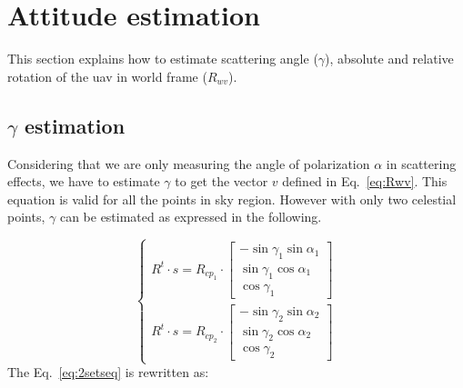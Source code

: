 \graphicspath{{./content/intro/figures/}}

\section{Attitude estimation}
\label{sec:g-abs-rel}
This section explains how to estimate scattering angle ($\gamma$), absolute and
relative rotation of the \gls{uav} in world frame ($R_{wv}$).

\subsection{$\gamma$ estimation}
\label{sec:gamma}
Considering that we are only measuring the angle of polarization $\alpha$
in scattering effects, we have to estimate $\gamma$ to get the vector
$v$ defined in Eq.~\ref{eq:Rwv}. This equation is valid for all the points in
sky region. However with only two celestial points, $\gamma$ can be estimated as
expressed in the following.

\begin{equation}
\begin{cases}
R^{t}\cdot s=R_{cp_{1}}\cdot\left[\begin{array}{c}
-\sin\gamma_{1}\sin\alpha_{1}\\
\sin\gamma_{1}\cos\alpha_{1}\\
\cos\gamma_{1}
\end{array}\right]\\
R^{t}\cdot s=R_{cp_{2}}\cdot\left[\begin{array}{c}
-\sin\gamma_{2}\sin\alpha_{2}\\
\sin\gamma_{2}\cos\alpha_{2}\\
\cos\gamma_{2}
\end{array}\right]
\end{cases}\label{eq:2setseq}
\end{equation}
\noindent The Eq.~\ref{eq:2setseq} is rewritten as:

